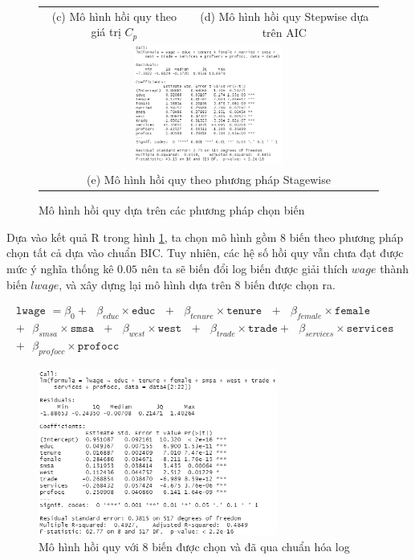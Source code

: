 \begin{figure}[H]
\begin{tabular}{cc}
		(c) Mô hình hồi quy theo giá trị $C_p$ & (d) Mô hình hồi quy Stepwise dựa trên AIC \\[6pt]
		\multicolumn{2}{c}{\includegraphics[width=0.45\textwidth]{../Photo Of Result/model-stagewise-4} }\\
		\multicolumn{2}{c}{(e) Mô hình hồi quy theo phương pháp Stagewise}
	\end{tabular}
	\caption{Mô hình hồi quy dựa trên các phương pháp chọn biến}
	\label{5-model-reg}
\end{figure}

Dựa vào kết quả R trong hình \ref{5-model-reg}, ta chọn mô hình gồm 8 biến theo phương pháp chọn tất cả dựa vào chuẩn BIC. Tuy nhiên, các hệ số hồi quy vẫn chưa đạt được mức ý nghĩa thống kê $0.05$ nên ta sẽ biến đổi log biến được giải thích $wage$ thành biến $lwage$, và xây dựng lại mô hình dựa trên 8 biến được chọn ra.

\begin{equation*}
	\begin{multlined}
		\texttt{lwage } = \beta_0 + \text{ } \beta_{educ}\times \texttt{educ} \text{ } + \text{ } \beta_{tenure} \times \texttt{tenure} \text{ }+\text{ }\beta_{female} \times \texttt{female} \text{ } \\
		+\text{ }\beta_{smsa} \times\texttt{smsa}\text{ }  
		+ \text{ }\beta_{west} \times \texttt{west} \text{ } 
		+ \text{ }\beta_{trade}\times \texttt{trade} + \text{ }\beta_{services} \times \texttt{services} \text{ }\\ + \text{ }\beta_{profocc}\times \texttt{profocc}
	\end{multlined}
\end{equation*}


\begin{figure}[H]
	\centering
	\includegraphics[width=0.7\textwidth]{../Photo Of Result/model-final-4}
	\caption{Mô hình hồi quy với 8 biến được chọn và đã qua chuẩn hóa log}
	\label{model-final-4}
\end{figure}

